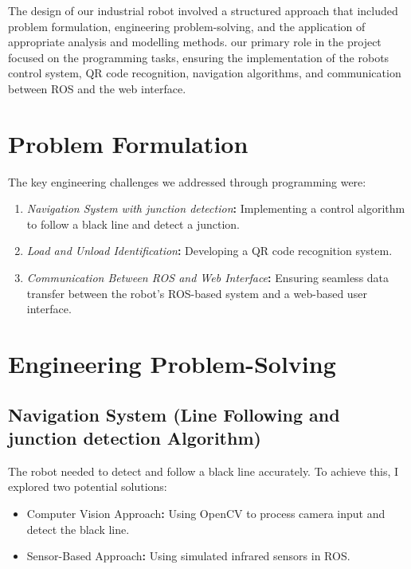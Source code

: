 \documentclass[a4paper,12pt]{extreport}
\begin{document}
The design of our industrial robot involved a structured approach that
included problem formulation, engineering problem-solving, and the
application of appropriate analysis and modelling methods. our primary
role in the project focused on the programming tasks, ensuring the
implementation of the robot\textquotesingle s control system, QR code
recognition, navigation algorithms, and communication between ROS and
the web interface.

\section{Problem Formulation}

The key engineering challenges we addressed through programming were:

\begin{enumerate}
\def\labelenumi{\arabic{enumi}.}
\item
  \emph{Navigation System with junction detection}\textbf{:}
  Implementing a control algorithm to follow a black line and detect a
  junction.
\item
  \emph{Load and Unload Identification}\textbf{:} Developing a QR code
  recognition system.
\item
  \emph{Communication Between ROS and Web Interface}\textbf{:} Ensuring
  seamless data transfer between the robot's ROS-based system and a
  web-based user interface.
\end{enumerate}

\section{Engineering Problem-Solving}

\subsection{Navigation System (Line Following and junction detection Algorithm)}

The robot needed to detect and follow a black line accurately. To
achieve this, I explored two potential solutions:

\begin{itemize}
\item
  Computer Vision Approach\textbf{:} Using OpenCV to process camera
  input and detect the black line.
\item
  Sensor-Based Approach\textbf{:} Using simulated infrared sensors in
  ROS.
\end{itemize}
\end{document}
